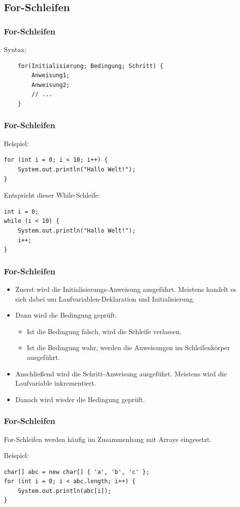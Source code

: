 \documentclass[final]{beamer}
\begin{document}
\subsection{For-Schleifen}
\begin{frame}[containsverbatim]
	\frametitle{For-Schleifen}
	Syntax:
	\begin{lstlisting}
	for(Initialisierung; Bedingung; Schritt) {
		Anweisung1;
		Anweisung2;
		// ...
	}
	\end{lstlisting}
\end{frame}
\begin{frame}[containsverbatim]
	\frametitle{For-Schleifen}
	Beispiel:
	\begin{lstlisting}
for (int i = 0; i < 10; i++) {
	System.out.println("Hallo Welt!");
}
	\end{lstlisting}
	Entspricht dieser While-Schleife:
	\begin{lstlisting}
int i = 0;
while (i < 10) {
	System.out.println("Hallo Welt!");
	i++;
}
	\end{lstlisting}
\end{frame}
\begin{frame}
	\frametitle{For-Schleifen}
	\begin{itemize}
	\item{Zuerst wird die Initialisierungs-Anweisung ausgeführt.
		{\small Meistens handelt es sich dabei um Laufvariablen-Deklaration und Initialisierung.}
		}
		\item{Dann wird die Bedingung geprüft.
		\begin{itemize}
			\item{Ist die Bedingung falsch, wird die Schleife verlassen.}
			\item{Ist die Bedingung wahr, werden die Anweisungen im Schleifenkörper ausgeführt.}
		\end{itemize}}
		\item{Anschließend wird die Schritt-Anweisung ausgeführt.
		{\small Meistens wird die Laufvariable inkrementiert.}
		}
		\item{Danach wird wieder die Bedingung geprüft.}
	\end{itemize}
\end{frame}
\begin{frame}[containsverbatim]
	\frametitle{For-Schleifen}
	For-Schleifen werden häufig im Zusammenhang mit Arrays eingesetzt.

	Beispiel:
	\begin{lstlisting}
char[] abc = new char[] { 'a', 'b', 'c' };
for (int i = 0; i < abc.length; i++) {
	System.out.println(abc[i]);
}
	\end{lstlisting}
\end{frame}
\end{document}
